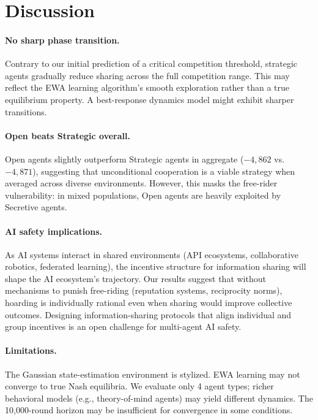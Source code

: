 \documentclass[11pt]{article}
\begin{document}
\section{Discussion}

\paragraph{No sharp phase transition.}
Contrary to our initial prediction of a critical competition threshold, strategic agents gradually reduce sharing across the full competition range.
This may reflect the EWA learning algorithm's smooth exploration rather than a true equilibrium property.
A best-response dynamics model might exhibit sharper transitions.

\paragraph{Open beats Strategic overall.}
Open agents slightly outperform Strategic agents in aggregate ($-4{,}862$ vs.\ $-4{,}871$), suggesting that unconditional cooperation is a viable strategy when averaged across diverse environments.
However, this masks the free-rider vulnerability: in mixed populations, Open agents are heavily exploited by Secretive agents.

\paragraph{AI safety implications.}
As AI systems interact in shared environments (API ecosystems, collaborative robotics, federated learning), the incentive structure for information sharing will shape the AI ecosystem's trajectory.
Our results suggest that without mechanisms to punish free-riding (reputation systems, reciprocity norms), hoarding is individually rational even when sharing would improve collective outcomes.
Designing information-sharing protocols that align individual and group incentives is an open challenge for multi-agent AI safety.

\paragraph{Limitations.}
The Gaussian state-estimation environment is stylized.
EWA learning may not converge to true Nash equilibria.
We evaluate only 4 agent types; richer behavioral models (e.g., theory-of-mind agents) may yield different dynamics.
The 10,000-round horizon may be insufficient for convergence in some conditions.
\end{document}
